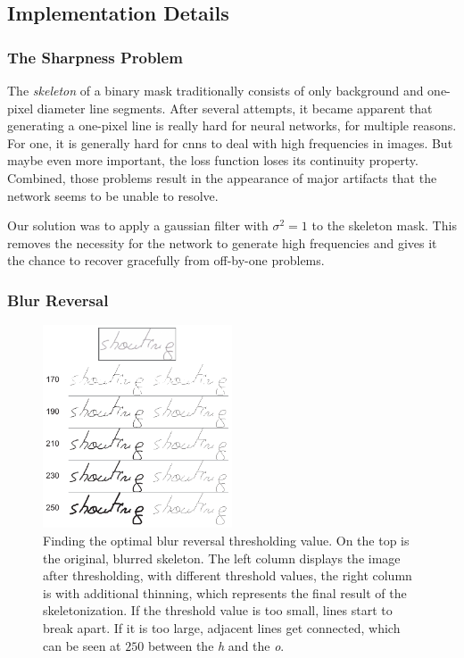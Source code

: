 \subsection{Implementation Details}\label{subsec:skeletonizationImplDetails}
\subsubsection{The Sharpness Problem}

The \emph{skeleton} of a binary mask traditionally consists of only background and one-pixel diameter line segments. After several attempts, it became apparent that generating a one-pixel line is really hard for neural networks, for multiple reasons. For one, it is generally hard for \glspl{cnn} to deal with high frequencies in images. But maybe even more important, the loss function loses its continuity property. Combined, those problems result in the appearance of major artifacts that the network seems to be unable to resolve.

Our solution was to apply a gaussian filter with ${\sigma}^{2} = 1$ to the skeleton mask. This removes the necessity for the network to generate high frequencies and gives it the chance to recover gracefully from off-by-one problems.

\subsubsection{Blur Reversal}

\begin{figure}
  \centering
  \includegraphics[width=0.5\textwidth]{../assets/skeletonization/thresholding_study/thresholding_study.pdf}
  \caption[Finding the optimal blur reversal thresholding value]{Finding the optimal blur reversal thresholding value. On the top is the original, blurred skeleton. The left column displays the image after thresholding, with different threshold values, the right column is with additional thinning, which represents the final result of the skeletonization. If the threshold value is too small, lines start to break apart. If it is too large, adjacent lines get connected, which can be seen at $250$ between the \emph{h} and the \emph{o}.}
  \label{fig:skeletonizationThresholdStudy}
\end{figure}


